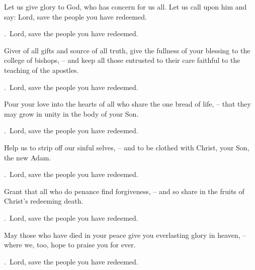 \lettrine[loversize=0.15,lines=2]{L}{}et us give glory to God, who has concern for us all. Let us call upon him and say: Lord, save the people you have redeemed.
\par \Rbar.~Lord, save the people you have redeemed.

Giver of all gifts and source of all truth, give the fullness of your blessing to the college of bishops,
– and keep all those entrusted to their care faithful to the teaching of the apostles.
\par \Rbar.~Lord, save the people you have redeemed.

Pour your love into the hearts of all who share the one bread of life,
– that they may grow in unity in the body of your Son.
\par \Rbar.~Lord, save the people you have redeemed.

Help us to strip off our sinful selves,
– and to be clothed with Christ, your Son, the new Adam.
\par \Rbar.~Lord, save the people you have redeemed.

Grant that all who do penance find forgiveness,
– and so share in the fruits of Christ’s redeeming death.
\par \Rbar.~Lord, save the people you have redeemed.

May those who have died in your peace give you everlasting glory in heaven,
– where we, too, hope to praise you for ever. 
\par \Rbar.~Lord, save the people you have redeemed.
